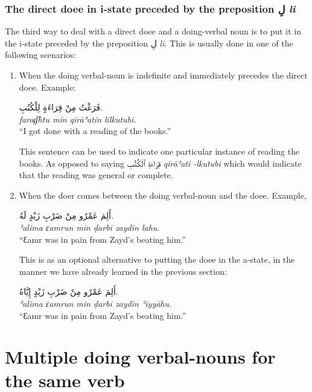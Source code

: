 \documentclass[
  10pt,
]{book}
\begin{document}
\subsubsection{\texorpdfstring{The direct doee in i-state preceded by the preposition \foreignlanguage{arabic}{لِ} \emph{li}}{The direct doee in i-state preceded by the preposition لِ li}}\label{the-direct-doee-in-i-state-preceded-by-the-preposition-ux644-li}

The third way to deal with a direct doee and a doing-verbal noun is to put it in the i-state preceded by the preposition \foreignlanguage{arabic}{لِ} \emph{li}. This is usually done in one of the following scenarios:

\begin{enumerate}
\def\labelenumi{\arabic{enumi}.}
\item
  When the doing verbal-noun is indefinite and immediately precedes the direct doee. Example:

  \foreignlanguage{arabic}{فَرَغْتُ مِنْ قِرَاءَةٍ لِلْکُتُبِ.}\\
  \emph{farag͡htu min qirāʾatin lilkutubi.}\\
  \enquote{I got done with a reading of the books.}

  This sentence can be used to indicate one particular instance of reading the books. As opposed to saying \foreignlanguage{arabic}{قِرَاءَةِ ٱلْکُتُبِ} \emph{qirāʾati -lkutubi} which would indicate that the reading was general or complete.
\item
  When the doer comes between the doing verbal-noun and the doee. Example,

  \foreignlanguage{arabic}{أَلِمَ عَمْرٌو مِنْ ضَرْبِ زَيْدٍ لَهُ.}\\
  \emph{ʾalima ɛamrun min ḍarbi zaydin lahu.}\\
  \enquote{Ɛamr was in pain from Zayd's beating him.}

  This is as an optional alternative to putting the doee in the a-state, in the manner we have already learned in the previous section:

  \foreignlanguage{arabic}{أَلِمَ عَمْرٌو مِنْ ضَرْبِ زَيْدٍ إِيَّاهُ.}\\
  \emph{ʾalima ɛamrun min ḍarbi zaydin ʾiyyāhu.}\\
  \enquote{Ɛamr was in pain from Zayd's beating him.}
\end{enumerate}

\section{Multiple doing verbal-nouns for the same verb}\label{multiple-doing-verbal-nouns-for-the-same-verb}
\end{document}
